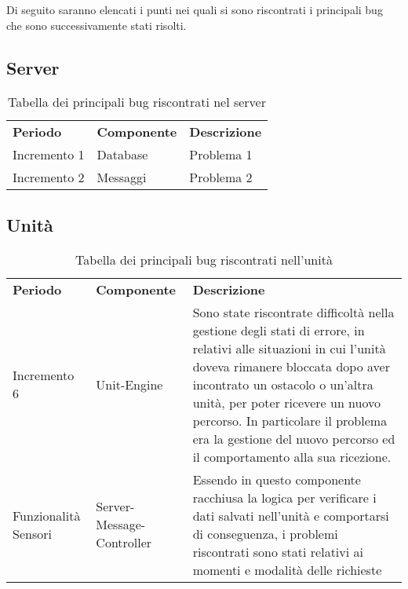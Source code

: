 Di seguito saranno elencati i punti nei quali si sono riscontrati i principali bug che sono successivamente stati risolti.

\subsection{Server}

\begin{table} [!ht]
	\begin{center}
		\begin{tabular} { m{2.5cm} m{2.5cm} m{11cm}  }
			\rowcolor{lightgray}
			\textbf{Periodo} & \textbf{Componente} & \textbf{Descrizione}\\
			
			Incremento 1 & Database & Problema 1 \\
			Incremento 2 & Messaggi & Problema 2 \\
								
		\end{tabular}
	\end{center}
	\caption{Tabella dei principali bug riscontrati nel server}
\end{table}

\subsection{Unità}

\begin{table} [!ht]
	\begin{center}
		\begin{tabular} { m{2.5cm} m{2.5cm} m{11cm}  }
			\rowcolor{lightgray}
			\textbf{Periodo} & \textbf{Componente} & \textbf{Descrizione}\\
			
			Incremento 6 & Unit-Engine & Sono state riscontrate difficoltà nella gestione degli stati di errore, in relativi alle situazioni in cui l'unità doveva rimanere bloccata dopo aver incontrato un ostacolo o un'altra unità, per poter ricevere un nuovo percorso. In particolare il problema era la gestione del nuovo percorso ed il comportamento alla sua ricezione. \\
			
			Funzionalità Sensori & Server-Message-Controller & Essendo in questo componente racchiusa la logica per verificare i dati salvati nell'unità e comportarsi di conseguenza, i problemi riscontrati sono stati relativi ai momenti e modalità delle richieste  \\
			
		\end{tabular}
	\end{center}
	\caption{Tabella dei principali bug riscontrati nell'unità}
\end{table}

